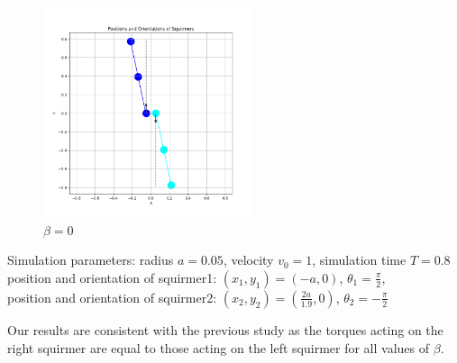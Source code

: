 \documentclass{article}
\begin{document}
\begin{figure}[H]
\begin{minipage}{0.49\textwidth}
        \caption{\footnotesize $\beta = 3$}
    \end{minipage}
    \includegraphics[width=0.55\textwidth]{graphs/simulations/sim_sq_sq/beta0/mpi_2_.png}
    \caption{\footnotesize $\beta = 0$}
\end{figure}
\begin{center}
    Simulation parameters: radius $a=0.05$, velocity $v_0=1$, simulation time $T=0.8$\\
        position and orientation of squirmer1: $(x_1,y_1)=(-a,0)$, $\theta_1=\frac{\pi}{2}$,\\
        position and orientation of squirmer2: $(x_2,y_2)=(\frac{2a}{1.9},0)$, $\theta_2=-\frac{\pi}{2}$
\end{center}
Our results are consistent with the previous study\cite{Stark} as the torques acting on the right squirmer are equal to
those acting on the left squirmer for all values of $\beta$.
\end{document}
